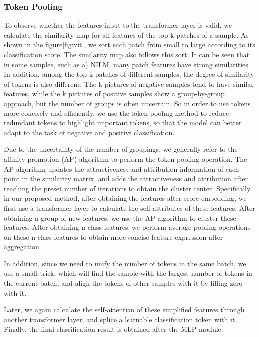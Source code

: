 \subsubsection{Token Pooling}
To observe whether the features input to the transformer layer is valid, we calculate the similarity map for all features of the top k patches of a sample. As shown in the figure\ref{fig:vit}, we sort each patch from small to large according to its classification score. The similarity map also follows this sort. It can be seen that in some samples, such as a) NILM, many patch features have strong similarities. In addition, among the top k patches of different samples, the degree of similarity of tokens is also different. The k pictures of negative samples tend to have similar features, while the k pictures of positive samples show a group-by-group approach, but the number of groups is often uncertain.
So in order to use tokens more concisely and efficiently, we use the token pooling method to reduce redundant tokens to highlight important tokens, so that the model can better adapt to the task of negative and positive classification.


Due to the uncertainty of the number of groupings, we generally refer to the affinity promotion (AP)\cite{frey2007clustering} algorithm to perform the token pooling operation. The AP algorithm updates the attractiveness and attribution information of each point in the similarity matrix, and adds the attractiveness and attribution after reaching the preset number of iterations to obtain the cluster center. Specifically, in our proposed method, after obtaining the features after score embedding, we first use a transformer layer to calculate the self-attributes of these features. After obtaining a group of new features, we use the AP algorithm to cluster these features. After obtaining n-class features, we perform average pooling operations on these n-class features to obtain more concise feature expression after aggregation.


In addition, since we need to unify the number of tokens in the same batch, we use a small trick, which will find the sample with the largest number of tokens in the current batch, and align the tokens of other samples with it by filling zero with it. 

Later, we again calculate the self-attention of these simplified features through another transformer layer, and splice a learnable classification token with it. Finally, the final classification result is obtained after the MLP module.
